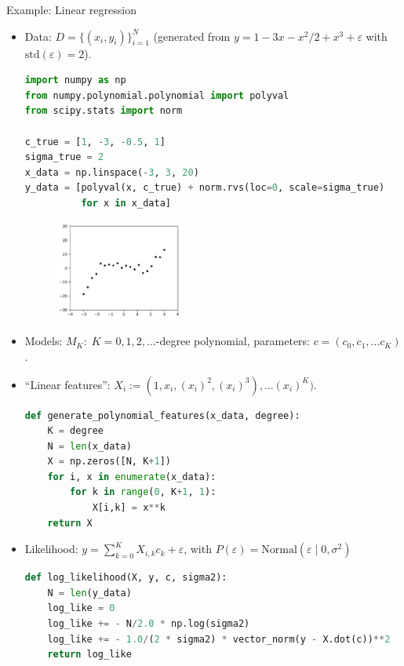 \newpage
\no Example: Linear regression
\begin{itemize}
	\item Data: $D = \{(x_i, y_i)\}_{i=1}^N$ (generated from $y = 1 - 3x - x^2/2 + x^3 + \varepsilon$ with $\text{std}(\varepsilon) = 2$).
\begin{lstlisting}[language=python]
import numpy as np
from numpy.polynomial.polynomial import polyval
from scipy.stats import norm

c_true = [1, -3, -0.5, 1]
sigma_true = 2
x_data = np.linspace(-3, 3, 20)
y_data = [polyval(x, c_true) + norm.rvs(loc=0, scale=sigma_true) 
          for x in x_data]
\end{lstlisting}
	\begin{figure}[h]
		\centering
		\includegraphics[width=0.4\textwidth]{./figs/03-linear-regression-data.pdf}
	\end{figure}
	\item Models: $M_K:\;K=0,1,2,\ldots$-degree polynomial, parameters: $c = (c_0, c_1, \ldots c_K)$.
	\item ``Linear features'': $X_i := (1, x_i, (x_i)^2, (x_i)^3),\ldots (x_i)^K)$.
\begin{lstlisting}[language=python]
def generate_polynomial_features(x_data, degree):
    K = degree
    N = len(x_data)
    X = np.zeros([N, K+1])
    for i, x in enumerate(x_data):
        for k in range(0, K+1, 1):
            X[i,k] = x**k
    return X
\end{lstlisting}

	\item Likelihood:
	$y = \sum_{k=0}^K X_{i,k} c_k  + \varepsilon$, with $P(\varepsilon) = \text{Normal}(\varepsilon \;|\; 0, \sigma^2)$
\begin{lstlisting}[language=python]
def log_likelihood(X, y, c, sigma2):
    N = len(y_data)
    log_like = 0
    log_like += - N/2.0 * np.log(sigma2)
    log_like += - 1.0/(2 * sigma2) * vector_norm(y - X.dot(c))**2
    return log_like
\end{lstlisting}


\end{itemize}

